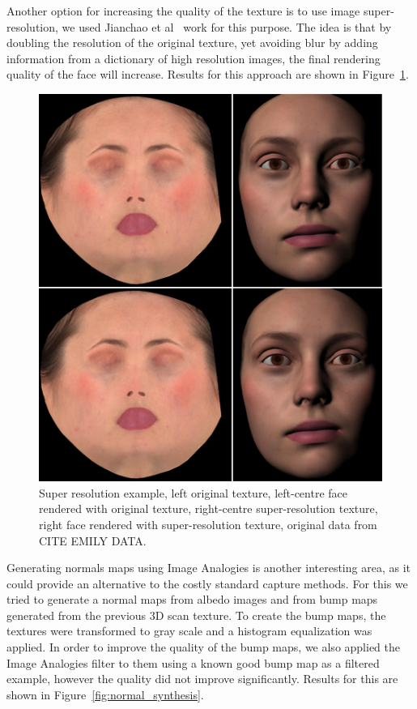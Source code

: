 \documentclass[11pt]{article}
\begin{document}
Another option for increasing the quality of the texture is to use image super-resolution, we used Jianchao et al~\cite{Jianchao2010} work for this purpose.
The idea is that by doubling the resolution of the original texture, yet avoiding blur by adding information from a dictionary of high resolution images, the final rendering quality of the face will increase.
Results for this approach are shown in Figure~\ref{fig:emily_super_resolution}.

\begin{figure}[htbp!]
\centering
\includegraphics[width=\textwidth]{img/emily_super_resolution}
	\caption{ Super resolution example, left original texture, left-centre face rendered with original texture, right-centre super-resolution texture, right face rendered with super-resolution texture, original data from CITE EMILY DATA.}
	\label{fig:emily_super_resolution}
\end{figure}

Generating normals maps using Image Analogies is another interesting area, as it could provide an alternative to the costly standard capture methods.
For this we tried to generate a normal maps from albedo images and from bump maps generated from the previous 3D scan texture.
To create the bump maps, the textures were transformed to gray scale and a histogram equalization was applied.
In order to improve the quality of the bump maps, we also applied the Image Analogies filter to them using a known good bump map as a filtered example, however the quality did not improve significantly. 
Results for this are shown in Figure~\ref{fig:normal_synthesis}.
\end{document}
